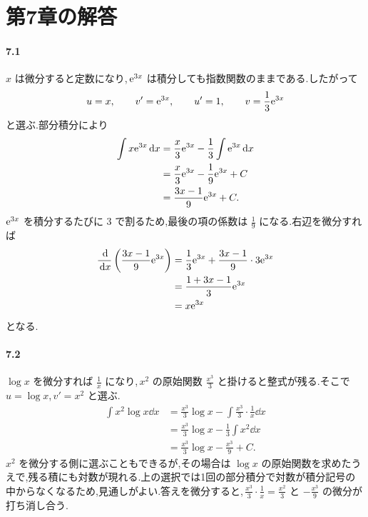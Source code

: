 \section{第7章の解答}\label{解答:第7章}

\paragraph{7.1}
$x$ は微分すると定数になり,\,$\mathrm{e}^{3x}$ は積分しても指数関数のままである.したがって
\[
 u=x,\qquad v'=\mathrm{e}^{3x},\qquad
 u'=1,\qquad v=\frac13\mathrm{e}^{3x}
\]
と選ぶ.部分積分により
\[
\begin{aligned}
 \int x\mathrm{e}^{3x}\,\mathrm{d} x
 &=\frac x3\mathrm{e}^{3x}-\frac13\int\mathrm{e}^{3x}\,\mathrm{d} x\\
 &=\frac x3\mathrm{e}^{3x}-\frac19\mathrm{e}^{3x}+C\\
 &=\frac{3x-1}{9}\mathrm{e}^{3x}+C.
\end{aligned}
\]
$\mathrm{e}^{3x}$ を積分するたびに $3$ で割るため,最後の項の係数は $\frac19$ になる.右辺を微分すれば
\[
\begin{aligned}
 \frac{\,\mathrm{d}}{\,\mathrm{d} x}\left(\frac{3x-1}{9}\mathrm{e}^{3x}\right)
 &=\frac13\mathrm{e}^{3x}+\frac{3x-1}{9}\cdot3\mathrm{e}^{3x}\\
 &=\frac{1+3x-1}{3}\mathrm{e}^{3x}\\
 &=x\mathrm{e}^{3x}
\end{aligned}
\]
となる.

\paragraph{7.2}
$\log x$ を微分すれば $\frac1x$ になり,\,$x^2$ の原始関数 $\frac{x^3}{3}$ と掛けると整式が残る.そこで $u=\log x$,\,$v'=x^2$ と選ぶ.
\[
\begin{aligned}
 \int x^2\log x\dd x
 &=\frac{x^3}{3}\log x
  -\int\frac{x^3}{3}\cdot\frac1x\dd x\\
 &=\frac{x^3}{3}\log x-\frac13\int x^2\dd x\\
 &=\frac{x^3}{3}\log x-\frac{x^3}{9}+C.
\end{aligned}
\]
$x^2$ を微分する側に選ぶこともできるが,その場合は $\log x$ の原始関数を求めたうえで,残る積にも対数が現れる.上の選択では1回の部分積分で対数が積分記号の中からなくなるため,見通しがよい.答えを微分すると,\,$\frac{x^3}{3}\cdot\frac1x=\frac{x^2}{3}$ と $-\frac{x^3}{9}$ の微分が打ち消し合う.

